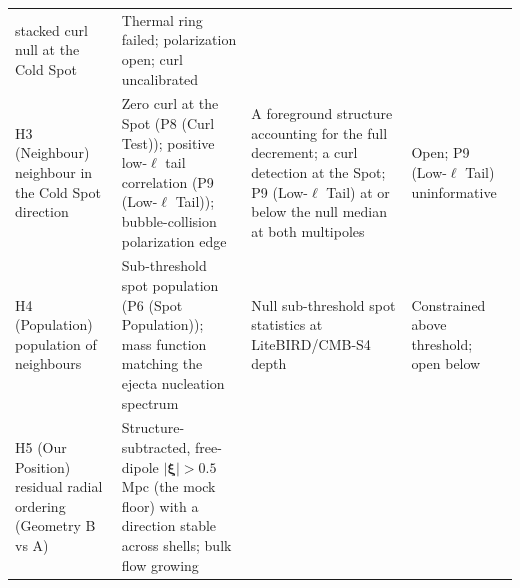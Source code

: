\documentclass[
]{article}
\begin{document}
\begin{longtable}[]{@{}llll@{}}
\begin{minipage}[t]{0.22\columnwidth}
stacked curl null at the Cold Spot\strut
\end{minipage} & \begin{minipage}[t]{0.22\columnwidth}\raggedright
Thermal ring failed; polarization open; curl uncalibrated\strut
\end{minipage}\tabularnewline
\begin{minipage}[t]{0.22\columnwidth}\raggedright
H3 (Neighbour) neighbour in the Cold Spot direction\strut
\end{minipage} & \begin{minipage}[t]{0.22\columnwidth}\raggedright
Zero curl at the Spot (P8 (Curl Test)); positive low-\(\ell\) tail
correlation (P9 (Low-\(\ell\) Tail)); bubble-collision polarization
edge\strut
\end{minipage} & \begin{minipage}[t]{0.22\columnwidth}\raggedright
A foreground structure accounting for the full decrement; a curl
detection at the Spot; P9 (Low-\(\ell\) Tail) at or below the null
median at both multipoles\strut
\end{minipage} & \begin{minipage}[t]{0.22\columnwidth}\raggedright
Open; P9 (Low-\(\ell\) Tail) uninformative\strut
\end{minipage}\tabularnewline
\begin{minipage}[t]{0.22\columnwidth}\raggedright
H4 (Population) population of neighbours\strut
\end{minipage} & \begin{minipage}[t]{0.22\columnwidth}\raggedright
Sub-threshold spot population (P6 (Spot Population)); mass function
matching the ejecta nucleation spectrum\strut
\end{minipage} & \begin{minipage}[t]{0.22\columnwidth}\raggedright
Null sub-threshold spot statistics at LiteBIRD/CMB-S4 depth\strut
\end{minipage} & \begin{minipage}[t]{0.22\columnwidth}\raggedright
Constrained above threshold; open below\strut
\end{minipage}\tabularnewline
\begin{minipage}[t]{0.22\columnwidth}\raggedright
H5 (Our Position) residual radial ordering (Geometry B vs A)\strut
\end{minipage} & \begin{minipage}[t]{0.22\columnwidth}\raggedright
Structure-subtracted, free-dipole \(|\boldsymbol{\xi}| > 0.5\) Mpc (the
mock floor) with a direction stable across shells; bulk flow growing

\end{minipage}
\end{longtable}
\end{document}
